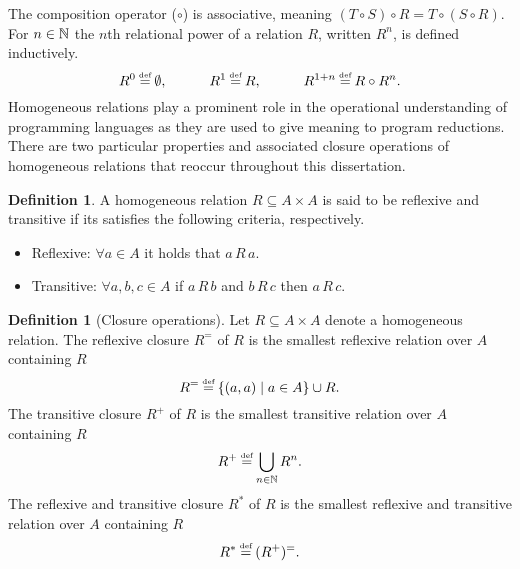 \documentclass[12pt,phd,lfcs,twoside,openright,logo,leftchapter,normalheadings]{infthesis}
\theoremstyle{plain}
\theoremstyle{definition}
\newtheorem{definition}[theorem]{Definition}
\begin{document}
The composition operator ($\circ$) is associative, meaning
$(T \circ S) \circ R = T \circ (S \circ R)$.
%
For $n \in \mathbb{N}$ the $n$th relational power of a relation $R$, written
$R^n$, is defined inductively.
\[
  R^0 \defas \emptyset, \quad\qquad R^1 \defas R, \quad\qquad R^{1 + n} \defas R \circ R^n.
\]
%
Homogeneous relations play a prominent role in the operational
understanding of programming languages as they are used to give
meaning to program reductions. There are two particular properties and
associated closure operations of homogeneous relations that reoccur
throughout this dissertation.
%
\begin{definition}
  A homogeneous relation $R \subseteq A \times A$ is said to be
  reflexive and transitive if its satisfies the following criteria,
  respectively.
  \begin{itemize}
    \item Reflexive: $\forall a \in A$ it holds that $a\,R\,a$.
    \item Transitive: $\forall a,b,c \in A$ if $a\,R\,b$ and $b\,R\,c$
      then $a\,R\,c$.
  \end{itemize}
\end{definition}

\begin{definition}[Closure operations]
  Let $R \subseteq A \times A$ denote a homogeneous relation. The
  reflexive closure $R^{=}$ of $R$ is the smallest reflexive relation
  over $A$ containing $R$
  \[
    R^{=} \defas \{ (a, a) \mid a \in A \} \cup R.
  \]
  The transitive closure $R^+$ of $R$ is the smallest transitive
  relation over $A$ containing $R$
  \[
    R^+ \defas \displaystyle\bigcup_{n \in \N} R^n.
  \]
  The reflexive and transitive closure $R^\ast$ of $R$ is the smallest
  reflexive and transitive relation over $A$ containing $R$
  \[
    R^\ast \defas (R^+)^{=}.
  \]
\end{definition}
%
\end{document}
